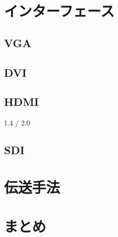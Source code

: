 \section{インターフェース}
\label{sec:interface}

\subsection{VGA}

\subsection{DVI}

\subsection{HDMI}
1.4 / 2.0

\subsection{SDI}



\section{伝送手法}

\section{まとめ}
